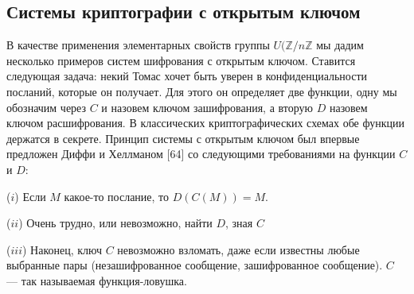 \subsection{Системы криптографии с открытым ключом}
В качестве применения элементарных свойств группы $U(\mathbb{Z}/n\mathbb{Z}$ мы дадим несколько примеров систем шифрования с открытым ключом. 
Ставится следующая задача: некий Томас хочет быть уверен в 
конфиденциальности посланий, которые он получает. Для этого он определяет
две функции, одну мы обозначим через $C$ и назовем ключом 
зашифрования, а вторую $D$ назовем ключом расшифрования. В классических
криптографических схемах обе функции держатся в секрете. Принцип
системы с открытым ключом был впервые предложен Диффи и Хеллманом [64] со следующими требованиями на функции $C$ и $D$:\par
  ($i$) Если $M$ какое-то послание, то $D(C(M)) = M$.\par
  ($ii$) Очень трудно, или невозможно, найти $D$, зная $C$\par
  ($iii$) Наконец, ключ $C$ невозможно взломать, даже если известны
любые выбранные пары (незашифрованное сообщение, зашифрованное
сообщение). $C$ --- так называемая функция-ловушка.
\pagebreak
\newpage

